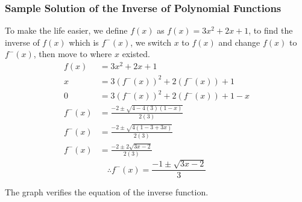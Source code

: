 \documentclass[12pt, titlepage]{article}
\begin{document}
        \subsubsection{Sample Solution of the Inverse of Polynomial Functions}
        To make the life easier, we define $f(x)$ as $f(x)=3x^2+2x+1$, to find the inverse of $f(x)$ which is $f^-(x)$, we switch $x$ to $f(x)$ and change $f(x)$ to $f^-(x)$, then move to where $x$ existed.
        \begin{align}
            f( x) &=3x^{2} +2x+1\\
            x&=3\left( f^{-}( x)\right)^{2} +2\left( f^{-}( x)\right) +1\\
            0&=3\left( f^{-}( x)\right)^{2} +2\left( f^{-}( x)\right) +1-x\\
            f^{-}( x) &=\frac{-2\pm \sqrt{4-4( 3)( 1-x)}}{2( 3)}\\
            f^{-}( x) &=\frac{-2\pm \sqrt{4( 1-3+3x)}}{2( 3)}\\
            f^{-}( x) &=\frac{-2\pm 2\sqrt{3x-2}}{2( 3)}
        \end{align}
        \begin{equation*}
            \therefore f^{-}( x) =\frac{-1\pm \sqrt{3x-2}}{3}
        \end{equation*}
        \begin{center}
        \end{center}
        The graph verifies the equation of the inverse function. 
    
\end{document}
